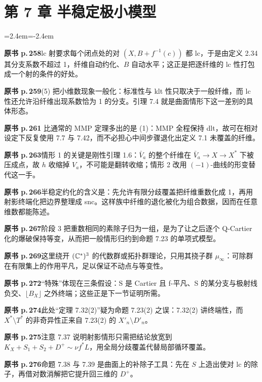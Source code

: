 \section*{第 7 章 半稳定极小模型}
\begin{list}{}{\leftmargin=2.4em\itemindent=-2.4em\itemsep=2pt\parsep=0pt}
\item \textbf{原书 p.\,258}\quad lc 射要求每个闭点处的对 $(X,B+f^{-1}(c))$ 都 lc，于是由定义 2.34 其分支系数不超过 1，纤维自动约化、$B$ 自动水平；这正是把逐纤维的 lc 性打包成一个射的条件的好处。
\item \textbf{原书 p.\,259}\quad (5) 把小维数现象一般化：标准性与 klt 性只取决于一般纤维，而 lc 性还允许沿纤维出现系数恰为 1 的分支。引理 7.4 就是曲面情形下这一差别的具体形态。
\item \textbf{原书 p.\,261} 比通常的 MMP 定理多出的是 (1)：MMP 全程保持 dlt，故可在相对设定下反复使用 7.7 与 7.42，而不必担心中间步骤退化出定义 7.1 未覆盖的纤维。
\item \textbf{原书 p.\,263}\quad 情形 1 的关键是刚性引理 1.6：$\bar V_a$ 的整个纤维在 $\bar V_a\to X\to X^*$ 下被压成点，故 $h$ 收缩掉 $V_a$，不可能是翻转收缩；情形 2 改用 $(-1)$-曲线的形变替代这一手。
\item \textbf{原书 p.\,266}\quad 半稳定约化的含义是：先允许有限分歧覆盖把纤维重数化成 1，再用射影终端化把边界整理成 snc。这样族中纤维的退化被化为组合数据，因而在任意维数都能陈述。
\item \textbf{原书 p.\,267}\quad 阶段 3 把重数相同的素除子归为一组，是为了让之后逐个 Q-Cartier 化的爆破保持等变，从而把一般情形归约到命题 7.23 的单项式模型。
\item \textbf{原书 p.\,269}\quad 这里绕开 $(\mathbb{C}^*)^3$ 的代数群或拓扑群理论，只用其挠子群 $\mu_\infty$：可除群在有限集上的作用平凡，足以保证不动点与等变性。
\item \textbf{原书 p.\,272}\quad “特殊”体现在三条假设：S 是 Cartier 且 f-平凡、S 的某分支与极射线负交、$\lfloor B_X\rfloor$ 之外终端；这些正是下一节证明所需。
\item \textbf{原书 p.\,274}\quad 此处“定理 7.32(2)”疑为命题 7.23(2) 之误：7.32(2) 讲终端性，而 $X^*\setminus T^*$ 的非奇异性正来自 7.23(2) 的 $X'_n\setminus D'_n$。
\item \textbf{原书 p.\,275}\quad 注意 7.37 说明射影情形只需把结论放宽到 $K_X+S_1+S_2+D^+\sim\nu f^*L$，用全局分歧覆盖代替局部循环覆盖。
\item \textbf{原书 p.\,276}\quad 命题 7.38 与 7.39 是曲面上的补除子工具：先在 $S$ 上造出使对 lc 的除子，再借对数消解把它提升回三维的 $D^+$。

\end{list}
